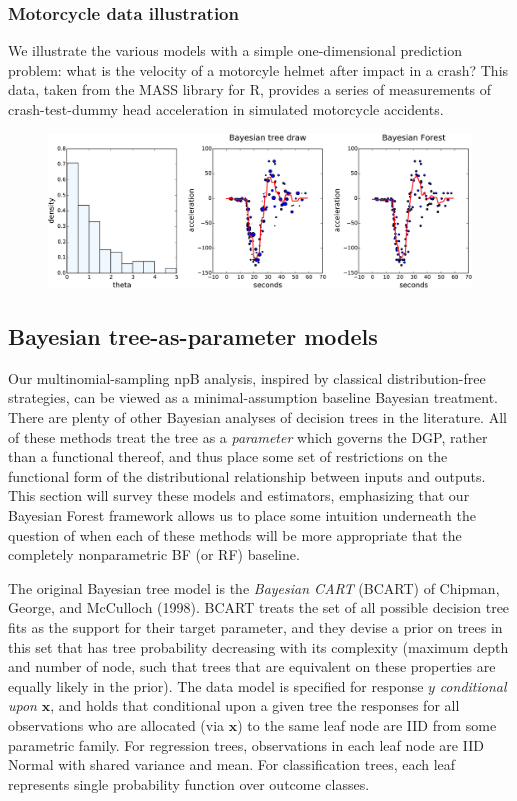 \documentclass[12pt]{article}
\begin{document}
    \subsubsection{Motorcycle data
illustration}\label{motorcycle-data-illustration}

We illustrate the various models with a simple one-dimensional
prediction problem: what is the velocity of a motorcyle helmet after
impact in a crash? This data, taken from the MASS library for R,
provides a series of measurements of crash-test-dummy head acceleration
in simulated motorcycle accidents.

\begin{figure}
\includegraphics[width=\textwidth]{../graphs/mcycle}    
\end{figure}    

    \subsection{Bayesian tree-as-parameter
models}\label{bayesian-tree-as-parameter-models}

Our multinomial-sampling npB analysis, inspired by classical
distribution-free strategies, can be viewed as a minimal-assumption
baseline Bayesian treatment. There are plenty of other Bayesian analyses
of decision trees in the literature. All of these methods treat the tree
as a \emph{parameter} which governs the DGP, rather than a functional
thereof, and thus place some set of restrictions on the functional form
of the distributional relationship between inputs and outputs. This
section will survey these models and estimators, emphasizing that our
Bayesian Forest framework allows us to place some intuition underneath
the question of when each of these methods will be more appropriate that
the completely nonparametric BF (or RF) baseline.

The original Bayesian tree model is the \emph{Bayesian CART} (BCART) of
Chipman, George, and McCulloch (1998). BCART treats the set of all
possible decision tree fits as the support for their target parameter,
and they devise a prior on trees in this set that has tree probability
decreasing with its complexity (maximum depth and number of node, such
that trees that are equivalent on these properties are equally likely in
the prior). The data model is specified for response $y$
\emph{conditional upon} $\mathbf{x}$, and holds that conditional upon a
given tree the responses for all observations who are allocated (via
$\mathbf{x}$) to the same leaf node are IID from some parametric family.
For regression trees, observations in each leaf node are IID Normal with
shared variance and mean. For classification trees, each leaf represents
single probability function over outcome classes.
\end{document}
